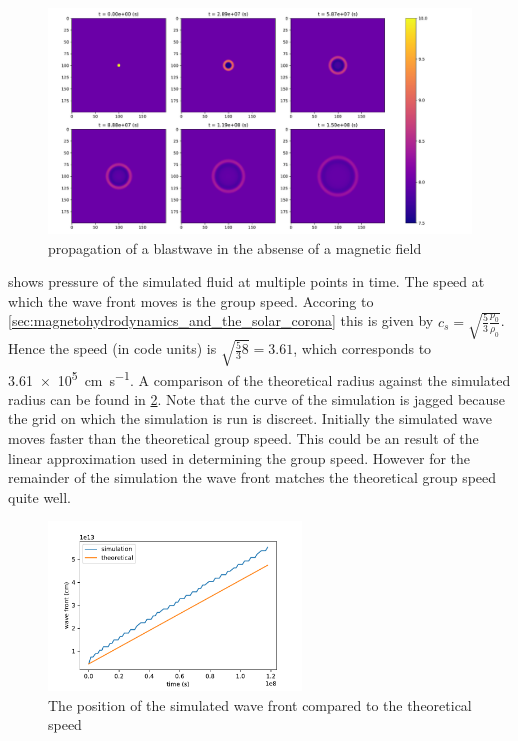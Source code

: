 \documentclass{article}
\begin{document}
\begin{figure}[h]
	\centering
	\includegraphics[width=\textwidth]{figures/blast_wave.pdf}
	\caption{propagation of a blastwave in the absense of a magnetic field}
	\label{fig:blastwave}
\end{figure}

 shows pressure of the simulated fluid at multiple points in time. 
The speed at which the wave front moves is the group speed. 
Accoring to \cref{sec:magnetohydrodynamics_and_the_solar_corona} this is given by $c_s = \sqrt{\frac{5}{3} \frac{p_0}{\rho_0}} $. Hence the speed (in code units) is $\sqrt{\frac{5}{3}8} = 3.61$, which corresponds to \SI{3.61e5}{\centi\metre\per\second}.
A comparison of the theoretical radius against the simulated radius can be found in \cref{fig:wave_front_speed}. 
Note that the curve of the simulation is jagged because the grid on which the simulation is run is discreet. 
Initially the simulated wave moves faster than the theoretical group speed. 
This could be an result of the linear approximation used in determining the group speed.
However for the remainder of the simulation the wave front matches the theoretical group speed quite well.


\begin{figure}[h]
	\centering
	\includegraphics[width=0.6\textwidth]{figures/wavefront_position}
	\caption{The position of the simulated wave front compared to the theoretical speed}
	\label{fig:wave_front_speed}
\end{figure}
\end{document}
